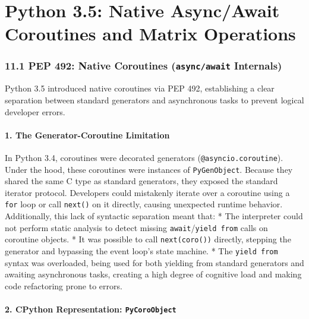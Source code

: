\hypertarget{python-3.5-native-asyncawait-coroutines-and-matrix-operations}{%
\chapter{Python 3.5: Native Async/Await Coroutines and Matrix
Operations}\label{python-3.5-native-asyncawait-coroutines-and-matrix-operations}}

\hypertarget{pep-492-native-coroutines-asyncawait-internals}{%
\subsection{\texorpdfstring{11.1 PEP 492: Native Coroutines
(\texttt{async/await}
Internals)}{11.1 PEP 492: Native Coroutines (async/await Internals)}}\label{pep-492-native-coroutines-asyncawait-internals}}

Python 3.5 introduced native coroutines via PEP 492, establishing a
clear separation between standard generators and asynchronous tasks to
prevent logical developer errors.

\hypertarget{the-generator-coroutine-limitation}{%
\subsubsection{1. The Generator-Coroutine
Limitation}\label{the-generator-coroutine-limitation}}

In Python 3.4, coroutines were decorated generators
(\passthrough{\lstinline!@asyncio.coroutine!}). Under the hood, these
coroutines were instances of \passthrough{\lstinline!PyGenObject!}.
Because they shared the same C type as standard generators, they exposed
the standard iterator protocol. Developers could mistakenly iterate over
a coroutine using a \passthrough{\lstinline!for!} loop or call
\passthrough{\lstinline!next()!} on it directly, causing unexpected
runtime behavior. Additionally, this lack of syntactic separation meant
that: * The interpreter could not perform static analysis to detect
missing
\passthrough{\lstinline!await!}/\passthrough{\lstinline!yield from!}
calls on coroutine objects. * It was possible to call
\passthrough{\lstinline!next(coro())!} directly, stepping the generator
and bypassing the event loop's state machine. * The
\passthrough{\lstinline!yield from!} syntax was overloaded, being used
for both yielding from standard generators and awaiting asynchronous
tasks, creating a high degree of cognitive load and making code
refactoring prone to errors.

\hypertarget{cpython-representation-pycoroobject}{%
\subsubsection{\texorpdfstring{2. CPython Representation:
\texttt{PyCoroObject}}{2. CPython Representation: PyCoroObject}}\label{cpython-representation-pycoroobject}}


